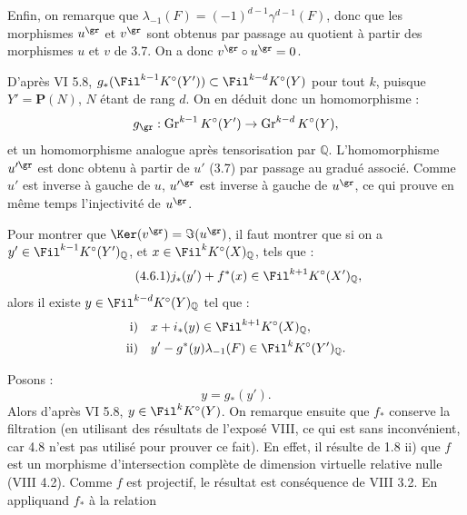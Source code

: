 Enfin, on remarque que \(\lambda_{-1}(F)=(-1)^{d-1}\gamma^{d-1}(F)\), donc que les morphismes \(u^{\gr}\) et \(v^{\gr}\) sont obtenus par passage au quotient à partir des morphismes \(u\) et \(v\) de 3.7. On a donc \(v^{\gr}\circ u^{\gr}=0\).

D'après VI 5.8, \(g_*(\Fil^{k-1}K^\circ(Y'))\subset \Fil^{k-d}K^\circ(Y)\) pour tout \(k\), puisque \(Y'=\mathbf P(N)\), \(N\) étant de rang \(d\). On en déduit donc un homomorphisme :
\[
  g_{\gr}:\operatorname{Gr}^{k-1}K^\circ(Y')
  \to\operatorname{Gr}^{k-d}K^\circ(Y),
\]
et un homomorphisme analogue après tensorisation par \(\mathbb Q\). L'homomorphisme \(u'^{\gr}\) est donc obtenu à partir de \(u'\) (3.7) par passage au gradué associé. Comme \(u'\) est inverse à gauche de \(u\), \(u'^{\gr}\) est inverse à gauche de \(u^{\gr}\), ce qui prouve en même temps l'injectivité de \(u^{\gr}\).

Pour montrer que \(\Ker(v^{\gr})=\Im(u^{\gr})\), il faut montrer que si on a \(y'\in\Fil^{k-1}K^\circ(Y')_{\mathbb Q}\), et \(x\in\Fil^kK^\circ(X)_{\mathbb Q}\), tels que :
\begin{equation}\tag{4.6.1}
  j_*(y')+f^*(x)\in\Fil^{k+1}K^\circ(X')_{\mathbb Q},
\end{equation}
alors il existe \(y\in\Fil^{k-d}K^\circ(Y)_{\mathbb Q}\) tel que :
\[
\begin{aligned}
\text{i)}\quad &x+i_*(y)\in\Fil^{k+1}K^\circ(X)_{\mathbb Q},\\
\text{ii)}\quad &y'-g^*(y)\lambda_{-1}(F)\in\Fil^{k}K^\circ(Y')_{\mathbb Q}.
\end{aligned}
\]

Posons :
\[
  y=g_*(y').
\]
Alors d'après VI 5.8, \(y\in\Fil^{k}K^\circ(Y)\). On remarque ensuite que \(f_*\) conserve la filtration (en utilisant des résultats de l'exposé VIII, ce qui est sans inconvénient, car 4.8 n'est pas utilisé pour prouver ce fait). En effet, il résulte de 1.8 ii) que \(f\) est un morphisme d'intersection complète de dimension virtuelle relative nulle (VIII 4.2). Comme \(f\) est projectif, le résultat est conséquence de VIII 3.2. En appliquand \(f_*\) à la relation
